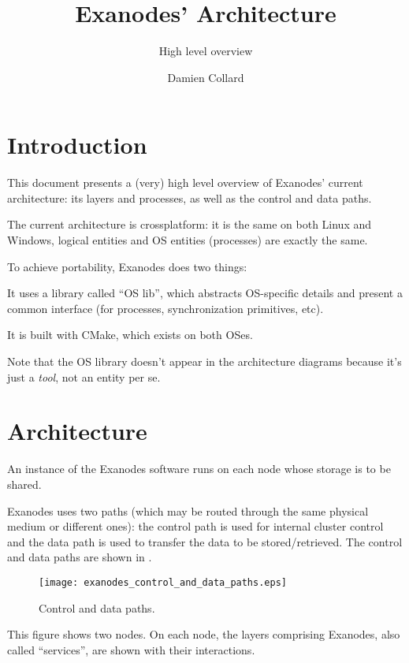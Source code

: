 \documentclass[a4paper,12pt,twoside]{report}
\title{Exanodes' Architecture}
\subtitle{High level overview}
\author{Damien Collard}
\begin{document}
\makesimpleheader

\section{\label{sec:introduction}Introduction}

This document presents a (very) high level overview of Exanodes'
current architecture: its layers and processes, as well as the control
and data paths.

The current architecture is crossplatform: it is the same on both
Linux and Windows, \ie logical entities and OS entities (processes)
are exactly the same.

To achieve portability, Exanodes does two things:
\begin{compactitem}
\item It uses a library called ``OS lib'', which abstracts OS-specific
  details and present a common interface (for processes,
  synchronization primitives, etc).
\item It is built with CMake, which exists on both OSes.
\end{compactitem}

Note that the OS library doesn't appear in the architecture diagrams
because it's just a {\em tool}, not an entity per se.

\section{\label{sec:architecture}Architecture}

An instance of the Exanodes software runs on each node whose storage
is to be shared.

Exanodes uses two paths (which may be routed through the same physical
medium or different ones): the control path is used for internal
cluster control and the data path is used to transfer the data to be
stored/retrieved. The control and data paths are shown in
.

\begin{figure}[ht]
  \centering
  \texttt{[image: exanodes\_control\_and\_data\_paths.eps]}
  \caption{\label{fig:control_and_data_paths}Control and data paths.}
\end{figure}

This figure shows two nodes. On each node, the layers comprising
Exanodes, also called ``services'', are shown with their interactions.
\end{document}
